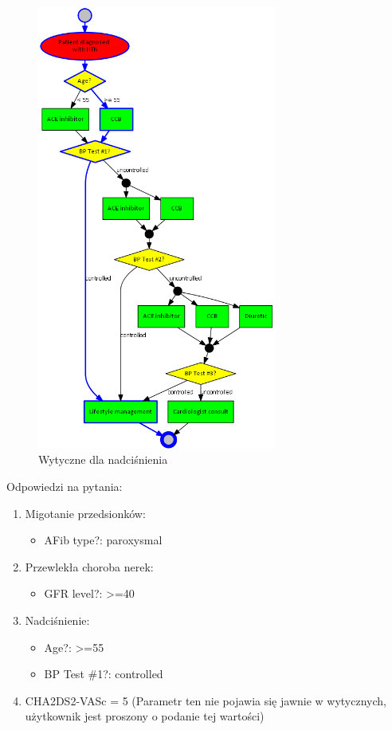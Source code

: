 \begin{figure}[H]
\centering
\includegraphics[width=0.7\textwidth]{img/htn-ver-3.png}
\caption{Wytyczne dla nadciśnienia}
\label{fig:htn}
\end{figure}
\newpage
\noindent Odpowiedzi na pytania:
\begin{enumerate}
\item{Migotanie przedsionków:
	\begin{itemize}
	\item{AFib type?: paroxysmal}
	\end{itemize}
}
\item{Przewlekła choroba nerek:
	\begin{itemize}
	\item{GFR level?: >=40}
	\end{itemize}
}
\item{Nadciśnienie:
	\begin{itemize}
	\item{Age?: >=55}
	\item{BP Test \#1?: controlled}
	\end{itemize}
}
\item{CHA2DS2-VASc = 5 (Parametr ten nie pojawia się jawnie w wytycznych, użytkownik jest proszony o podanie tej wartości)}
\end{enumerate}
